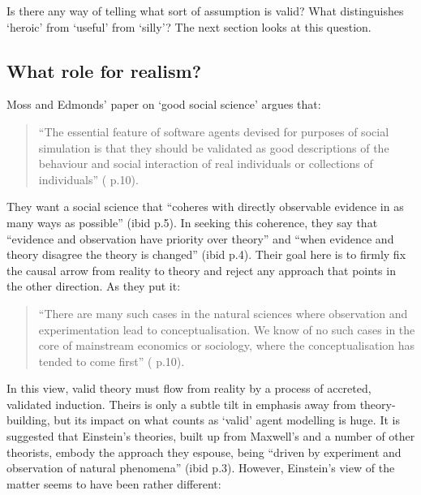 Is there any way of telling what sort of assumption is valid? What distinguishes `heroic' from `useful' from `silly'? The next section looks at this question.


\subsection{What role for realism? \label{sec:realism}}

Moss and Edmonds' paper on `good social science' argues that:

\begin{quote}
``The essential feature of software agents devised for purposes of social simulation is that they should be validated as good descriptions of the behaviour and social interaction of real individuals or collections of individuals'' (\citealt{moss_towards_2005} p.10).
\end{quote}

They want a social science that ``coheres with directly observable evidence in as many ways as possible'' (ibid p.5). In seeking this coherence, they say that ``evidence and observation have priority over theory'' and ``when evidence and theory disagree the theory is changed'' (ibid p.4). Their goal here is to firmly fix the causal arrow from reality to theory and reject any approach that points in the other direction. As they put it:

\begin{quote}
``There are many such cases in the natural sciences where observation and experimentation lead to conceptualisation. We know of no such cases in the core of mainstream economics or sociology, where the conceptualisation has tended to come first'' (\citealt{moss_towards_2005} p.10).
\end{quote}

In this view, valid theory must flow from reality by a process of accreted, validated induction. Theirs is only a subtle tilt in emphasis away from theory-building, but its impact on what counts as `valid' agent modelling is huge. It is suggested that Einstein's theories, built up from Maxwell's and a number of other theorists, embody the approach they espouse, being ``driven by experiment and observation of natural phenomena'' (ibid p.3). However, Einstein's view of the matter seems to have been rather different:

